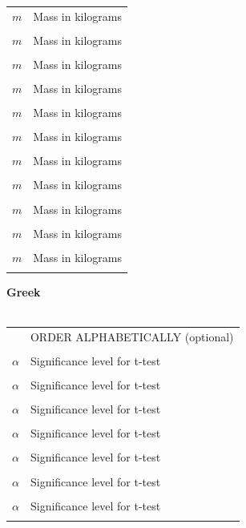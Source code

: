 {\begin{table}[H]
\begin{tabular}{ m{2.2cm}  m{12cm} }
	$m$ & Mass in kilograms \\ \\ 
	$m$ & Mass in kilograms \\ \\ 
	$m$ & Mass in kilograms \\ \\ 
	$m$ & Mass in kilograms \\ \\ 
	$m$ & Mass in kilograms \\ \\ 
	$m$ & Mass in kilograms \\ \\ 
	$m$ & Mass in kilograms \\ \\ 
	$m$ & Mass in kilograms \\ \\ 
	$m$ & Mass in kilograms \\ \\ 
	$m$ & Mass in kilograms \\ \\ 
	$m$ & Mass in kilograms \\ \\ 
\end{tabular} 
\end{table}
\begin{table}[H]
	\textbf{Greek}\\ \\
\begin{tabular}{ m{2.2cm}  m{12cm} }
	& \color{red} ORDER ALPHABETICALLY (optional) \color{black}\\ \\
	$\alpha$ & Significance level for t-test \\ \\
	$\alpha$ & Significance level for t-test \\ \\
	$\alpha$ & Significance level for t-test \\ \\
	$\alpha$ & Significance level for t-test \\ \\
	$\alpha$ & Significance level for t-test \\ \\
	$\alpha$ & Significance level for t-test \\ \\
	$\alpha$ & Significance level for t-test \\ \\

\end{tabular}
\end{table}}
